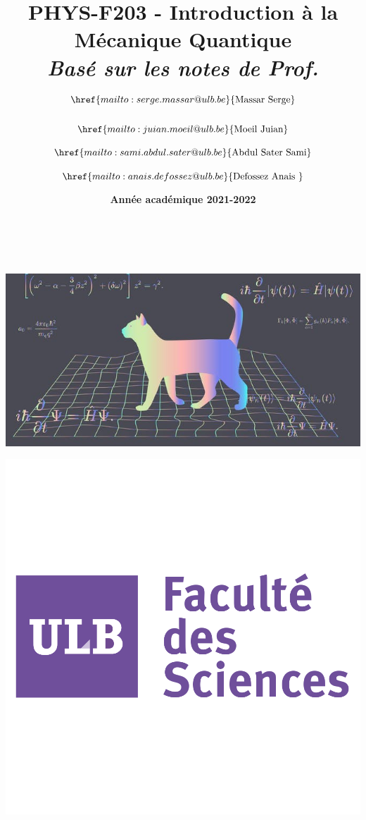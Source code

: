 \documentclass{book}
\title{\textbf{PHYS-F203 - Introduction à la Mécanique Quantique} \\ \textit{Basé sur les notes de Prof. $\href{mailto:serge.massar@ulb.be}{\text{Massar Serge}}$}}
\author{$\href{mailto:juian.moeil@ulb.be}{\text{Moeil Juian}}$ \and $\href{mailto:sami.abdul.sater@ulb.be}{\text{Abdul Sater Sami}}$ \and $\href{mailto:anais.defossez@ulb.be}{\text{Defossez Anais }}$}
\date{\textbf{Année académique 2021-2022}}
\numberwithin{equation}{part}
\begin{document}
\makeatletter
\begin{titlepage}
    \centering
    \huge{\@title} \\
    \vspace{1cm}
    \@date \\
    \vspace{1cm}
    \includegraphics[scale=0.65]{Images/cat.jpg} \\
    \vspace{1cm}
    \begin{minipage}{\linewidth}
        \begin{minipage}{0.45\linewidth}
            \begin{center}
                \includegraphics[scale=0.2]{Images/sciences.png} 

\end{center}
\end{minipage}
\end{minipage}
\end{titlepage}
\end{document}
